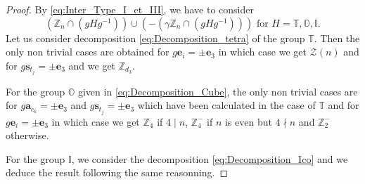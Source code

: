 \documentclass[11pt,a4paper]{amsart}
\newtheorem{lem}[thm]{Lemma}
\theoremstyle{definition}
\newcommand{\ZZ}{\mathbb{Z}}                %
\newcommand{\octa}{\mathbb{O}}              %
\newcommand{\ico}{\mathbb{I}}               %
\newcommand{\tetra}{\mathbb{T}}             %
\newcommand{\DD}{\mathbb{D}}                %
\newcommand{\1}{\mathds{1}}		            %
\newcommand{\ee}{\pmb{e}}                   %
\newcommand{\bs}{\mathbf{s}}
\newcommand{\ba}{\mathbf{a}}
\newcommand{\set}[1]{\left\{#1\right\}}     %
\begin{document}
\begin{proof}
	By \eqref{eq:Inter_Type_I_et_III}, we have to consider
	\begin{equation*}
(\ZZ_n\cap (gH g^{-1}))\cup (-(\gamma \ZZ_n\cap (gH g^{-1}))) \text{ for } H=\tetra,\octa,\ico.
 \end{equation*}
 Let us consider decomposition \eqref{eq:Decomposition_tetra} of the group $\tetra$. Then the only non trivial cases are obtained for $g\ee_i=\pm\ee_3$ in which case we get $\mathcal{Z}(n)$ and for $g\bs_{t_j}=\pm \ee_3$ and we get $\ZZ_{d_3}$.
 
 For the group $\octa$ given in \eqref{eq:Decomposition_Cube}, the only non trivial cases are for $g\ba_{c_k}=\pm \ee_3$ and $g\bs_{t_j}=\pm\ee_3$ which have been calculated in the case of $\tetra$ and for $g\ee_i=\pm \ee_3$ in which case we get $\ZZ_4$ if $4\mid n$, $\ZZ_4^-$ if $n$ is even but $4 \nmid n$ and $\ZZ_2^-$ otherwise.

 For the group $\ico$, we consider the decomposition \eqref{eq:Decomposition_Ico} and we deduce the result following the same reasonning.
\end{proof}


\end{document}
